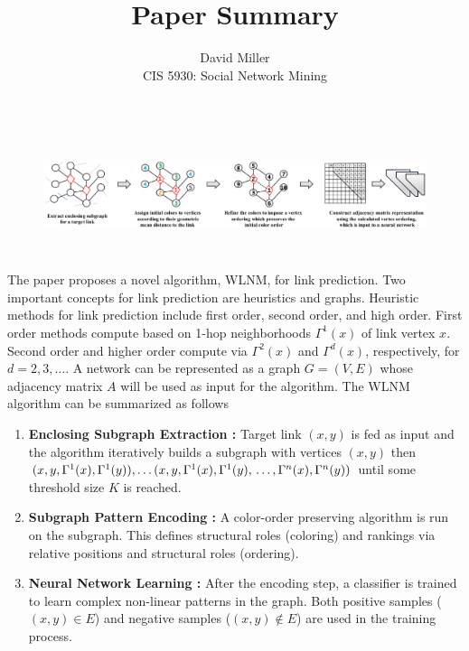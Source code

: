 \documentclass[12pt]{article}
\theoremstyle{remark}
\begin{document}
	
	\title{Paper Summary}
	\author{David Miller \\ 
		CIS 5930: Social Network Mining} 
	
	\maketitle 
	
	\begin{figure}[H]{}
		\centering
		\vspace{-15pt}
		\hspace{-10pt}
		\includegraphics[height=3.5cm,width=1\textwidth]{fig1.eps}
		\caption{}
		\vspace{0pt}
	\end{figure} 
	
	The paper proposes a novel algorithm, WLNM, for link prediction. Two important concepts for link prediction are heuristics  and graphs. Heuristic methods for link prediction include first order, second order, and high order. First order methods compute based on 1-hop neighborhoods $\Gamma^1(x)$ of link vertex $x$. Second order and higher order compute via $\Gamma^2(x)$ and $\Gamma^d(x)$, respectively, for $d = 2, 3, \dots$. A network can be represented as a graph $G = (V,E)$ whose adjacency matrix $A$ will be used as input for the algorithm.  The WLNM algorithm can be summarized as follows
	\begin{enumerate}
		\item \textbf{Enclosing Subgraph Extraction :} Target link $(x,y)$ is fed as input and the algorithm iteratively builds a subgraph with vertices $(x,y)$ then $(x,y,\Gamma^1(x), \Gamma^1(y)), \dots \\ (x,y,\Gamma^1(x), \Gamma^1(y), \, \dots , \Gamma^n(x), \Gamma^n(y))$ until some threshold size $K$ is reached. 
		\item \textbf{Subgraph Pattern Encoding :} A color-order preserving algorithm is run on the subgraph. This defines structural roles (coloring) and rankings via relative positions and structural roles (ordering).
		\item \textbf{Neural Network Learning :} After the encoding step, a classifier is trained to learn complex non-linear patterns in the graph. Both positive samples ($(x,y) \in E$) and negative samples ($(x,y) \not\in E$) are used in the training process. 
	\end{enumerate}
	
\end{document}
